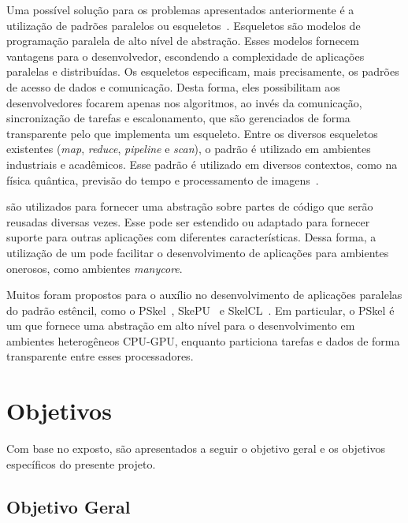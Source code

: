 Uma possível solução para os problemas apresentados anteriormente é a utilização de padrões
paralelos ou esqueletos~\cite{cole-skeleton:2004}. Esqueletos
são modelos de programação paralela de alto nível de abstração. Esses modelos fornecem
vantagens para o desenvolvedor, escondendo a complexidade de aplicações
paralelas e distribuídas. Os esqueletos especificam, mais precisamente,
os padrões de acesso de dados e comunicação. Desta forma, eles possibilitam aos
desenvolvedores focarem apenas nos algoritmos, ao invés da comunicação,
sincronização de tarefas e escalonamento, que são gerenciados de forma
transparente pelo \fw que implementa um esqueleto.
Entre os diversos esqueletos existentes (\textit{map}, \textit{reduce},
\textit{pipeline} e \textit{scan}), o padrão \stencil é
utilizado em ambientes industriais e acadêmicos. Esse padrão é utilizado em
diversos contextos, como na física quântica, previsão do tempo e
processamento de imagens~\cite{gonzalez06,holewinski12}.


\Fws são utilizados para fornecer uma abstração sobre partes de código que serão
reusadas diversas vezes. Esse \fw pode ser estendido ou adaptado para fornecer
suporte para outras aplicações com diferentes características. Dessa forma, a
utilização de um \fw pode facilitar o desenvolvimento de aplicações para
ambientes onerosos, como ambientes \textit{manycore}.

Muitos \fws foram propostos para o auxílio no desenvolvimento de aplicações paralelas do
padrão estêncil, como o
PSkel~\cite{pereira15}, SkePU~\cite{enmyren10} e SkelCL~\cite{steuwer11}. Em
particular, o PSkel é um \fw que fornece uma abstração em alto nível para o
desenvolvimento em ambientes heterogêneos CPU-GPU, enquanto particiona tarefas e
dados de forma transparente entre esses processadores.

\section{Objetivos}

Com base no exposto, são apresentados a seguir o objetivo geral e os objetivos específicos
do presente projeto.

\subsection{Objetivo Geral}


